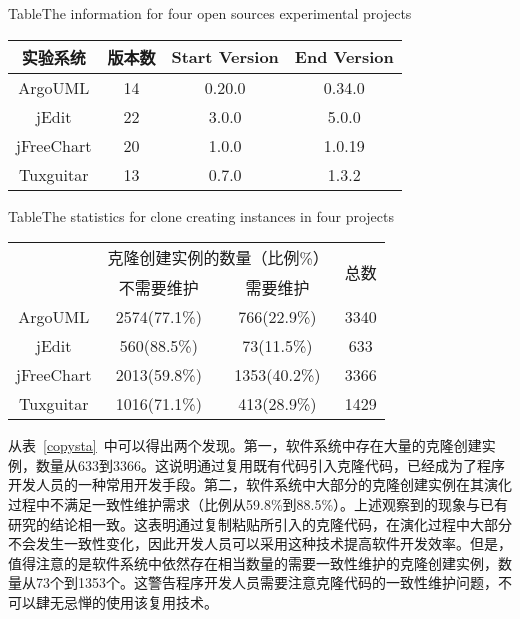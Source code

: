 \begin{table}[htbp]
{Table$\!$}{The information for four open sources experimental projects }
\vspace{0.5em}
\centering 
\wuhao
\begin{tabular}{cccc}
\toprule[1.5pt ]
{实验系统}&{版本数}&Start Version&End Version\\ 
\midrule[1pt]
ArgoUML&14&0.20.0&0.34.0\\ 
jEdit&22&3.0.0&5.0.0\\ 
jFreeChart&20&1.0.0&1.0.19\\ 
Tuxguitar&13&0.7.0&1.3.2\\ 
\bottomrule[1.5pt]
\end{tabular}
\end{table}

\begin{table}[htbp]
{Table$\!$}{The statistics for clone creating instances in four projects}
\vspace{0.5em}
\centering
\wuhao
\begin{tabular}{cccc}
\toprule[1.5pt]
~\multirow{2}{*}{实验系统}& \multicolumn{2}{c}{克隆创建实例的数量（比例\%）} & \multirow{2}{*}{总数}\\ 
\cline{2-3}
~&{不需要维护} &{需要维护}&~\\
\midrule[1pt]
ArgoUML&	2574(77.1\%)&	766(22.9\%)&	3340\\
jEdit&	560(88.5\%)&	73(11.5\%)&	633\\
jFreeChart&	2013(59.8\%)&	1353(40.2\%)&	3366\\
Tuxguitar&	1016(71.1\%)&	413(28.9\%)&	1429\\
\bottomrule[1.5pt]
\end{tabular}
\end{table}

从表~\ref{copysta}~中可以得出两个发现。第一，软件系统中存在大量的克隆创建实例，数量从633到3366。这说明通过复用既有代码引入克隆代码，已经成为了程序开发人员的一种常用开发手段。第二，软件系统中大部分的克隆创建实例在其演化过程中不满足一致性维护需求（比例从59.8\%到88.5\%）。上述观察到的现象与已有研究的结论相一致\cite{wang2014predicting}\cite{gode2011frequency}。这表明通过复制粘贴所引入的克隆代码，在演化过程中大部分不会发生一致性变化，因此开发人员可以采用这种技术提高软件开发效率。但是，值得注意的是软件系统中依然存在相当数量的需要一致性维护的克隆创建实例，数量从73个到1353个。这警告程序开发人员需要注意克隆代码的一致性维护问题，不可以肆无忌惮的使用该复用技术。

